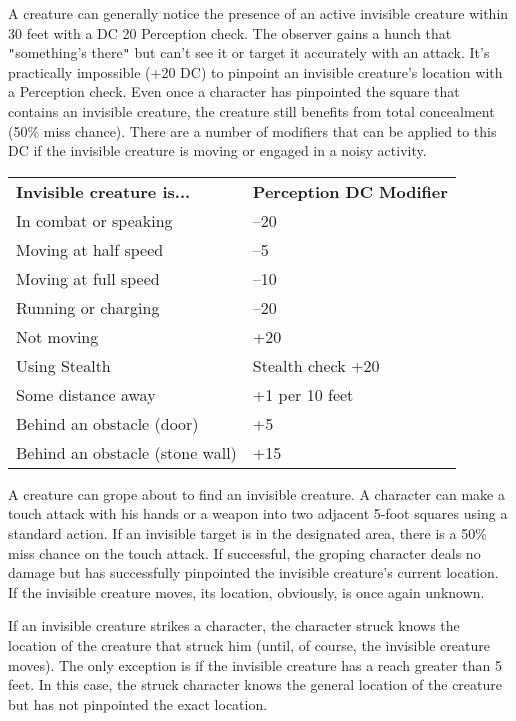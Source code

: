 A creature can generally notice the presence of an active invisible creature within 30 feet with a DC 20 Perception check. The observer gains a hunch that \texttt{{}"{}}something's there\texttt{{}"{}} but can't see it or target it accurately with an attack. It's practically impossible (+20 DC) to pinpoint an invisible creature's location with a Perception check. Even once a character has pinpointed the square that contains an invisible creature, the creature still benefits from total concealment (50\% miss chance). There are a number of modifiers that can be applied to this DC if the invisible creature is moving or engaged in a noisy activity.
\begin{tabular}{ll}
\textbf{Invisible creature is...} & \textbf{Perception DC Modifier} \\
In combat or speaking             & --20                             \\
Moving at half speed              & --5                              \\
Moving at full speed              & --10                             \\
Running or charging               & --20                             \\
Not moving                        & +20                             \\
Using Stealth                     & Stealth check +20               \\
Some distance away                & +1 per 10 feet                  \\
Behind an obstacle (door)         & +5                              \\
Behind an obstacle (stone wall)   & +15                            
\end{tabular}
				
A creature can grope about to find an invisible creature. A character can make a touch attack with his hands or a weapon into two adjacent 5-foot squares using a standard action. If an invisible target is in the designated area, there is a 50\% miss chance on the touch attack. If successful, the groping character deals no damage but has successfully pinpointed the invisible creature's current location. If the invisible creature moves, its location, obviously, is once again unknown.
				
If an invisible creature strikes a character, the character struck knows the location of the creature that struck him (until, of course, the invisible creature moves). The only exception is if the invisible creature has a reach greater than 5 feet. In this case, the struck character knows the general location of the creature but has not pinpointed the exact location.
				
